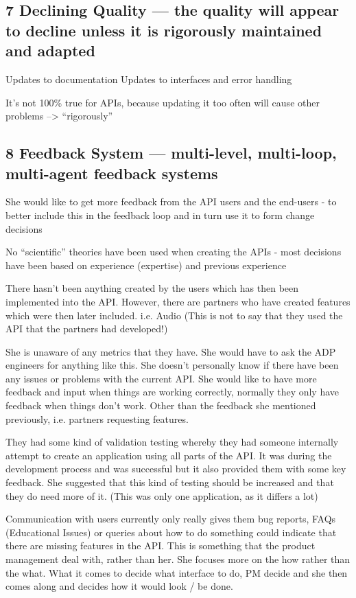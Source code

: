 \documentclass[conference]{IEEEtran}
\begin{document}
\subsection{7 Declining Quality — the quality will appear to decline unless it is rigorously maintained and adapted}
Updates to documentation
Updates to interfaces and error handling

It's not 100\% true for APIs, because updating it too often will cause other problems --> ``rigorously''

\subsection{8 Feedback System — multi-level, multi-loop, multi-agent feedback systems}
She would like to get more feedback from the API users and the end-users - to better include this in the feedback loop and in turn use it to form change decisions

No “scientific” theories have been used when creating the APIs - most decisions have been based on experience (expertise) and previous experience

There hasn’t been anything created by the users which has then been implemented into the API. However, there are partners who have created features which were then later included. i.e. Audio (This is not to say that they used the API that the partners had developed!)



She is unaware of any metrics that they have. She would have to ask the ADP engineers for anything like this. She doesn’t personally know if there have been any issues or problems with the current API. She would like to have more feedback and input when things are working correctly, normally they only have feedback when things don’t work. Other than the feedback she mentioned previously, i.e. partners requesting features.



They had some kind of validation testing whereby they had someone internally attempt to create an application using all parts of the API. It was during the development process and was successful but it also provided them with some key feedback. She suggested that this kind of testing should be increased and that they do need more of it. (This was only one application, as it differs a lot)

Communication with users currently only really gives them bug reports, FAQs (Educational Issues) or queries about how to do something could indicate that there are missing features in the API. This is something that the product management deal with, rather than her. She focuses more on the how rather than the what. What it comes to decide what interface to do, PM decide and she then comes along and decides how it would look / be done. 
\end{document}
